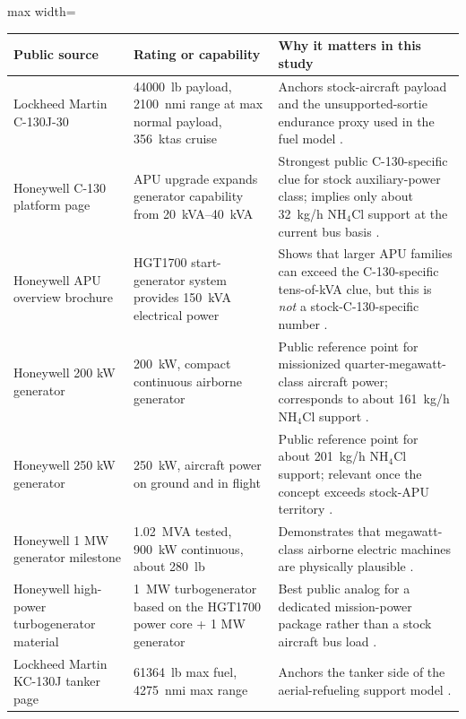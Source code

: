 \documentclass[8pt,twocolumn]{extarticle}
\begin{document}
\begin{table}[t]
\centering
\small
\setlength{\tabcolsep}{4pt}
\renewcommand{\arraystretch}{1.15}
\begin{adjustbox}{max width=\textwidth}
\begin{tabular}{p{} p{} p{}}
\toprule
\textbf{Public source} & \textbf{Rating or capability} & \textbf{Why it matters in this study} \\
\midrule
Lockheed Martin C-130J-30 & \SI{44000}{lb} payload, \SI{2100}{nmi} range at max normal payload, \SI{356}{ktas} cruise & Anchors stock-aircraft payload and the unsupported-sortie endurance proxy used in the fuel model \citep{LockheedC130J30}. \\
Honeywell C-130 platform page & APU upgrade expands generator capability from \SIrange{20}{40}{kVA} & Strongest public C-130-specific clue for stock auxiliary-power class; implies only about \SI{32}{kg/h} NH$_4$Cl support at the current bus basis \citep{HoneywellC130}. \\
Honeywell APU overview brochure & HGT1700 start-generator system provides \SI{150}{kVA} electrical power & Shows that larger APU families can exceed the C-130-specific tens-of-kVA clue, but this is \emph{not} a stock-C-130-specific number \citep{HoneywellAPUBrochure}. \\
Honeywell 200 kW generator & \SI{200}{kW}, compact continuous airborne generator & Public reference point for missionized quarter-megawatt-class aircraft power; corresponds to about \SI{161}{kg/h} NH$_4$Cl support \citep{Honeywell200kW}. \\
Honeywell 250 kW generator & \SI{250}{kW}, aircraft power on ground and in flight & Public reference point for about \SI{201}{kg/h} NH$_4$Cl support; relevant once the concept exceeds stock-APU territory \citep{Honeywell250kW}. \\
Honeywell 1 MW generator milestone & \SI{1.02}{MVA} tested, \SI{900}{kW} continuous, about \SI{280}{lb} & Demonstrates that megawatt-class airborne electric machines are physically plausible \citep{Honeywell1MWMilestone}. \\
Honeywell high-power turbogenerator material & \SI{1}{MW} turbogenerator based on the HGT1700 power core + 1 MW generator & Best public analog for a dedicated mission-power package rather than a stock aircraft bus load \citep{HoneywellHAL}. \\
Lockheed Martin KC-130J tanker page & \SI{61364}{lb} max fuel, \SI{4275}{nmi} max range & Anchors the tanker side of the aerial-refueling support model \citep{LockheedKC130J}. \\

\end{tabular}
\end{adjustbox}
\end{table}
\end{document}
